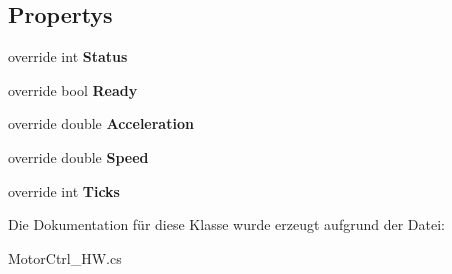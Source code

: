 \subsection*{Propertys}
\begin{DoxyCompactItemize}
\item 
\hypertarget{class_robot_ctrl_1_1_motor_ctrl___h_w_a0c39f88363e68b382cf946f37fe98e16}{
override int {\bfseries Status}}
\label{class_robot_ctrl_1_1_motor_ctrl___h_w_a0c39f88363e68b382cf946f37fe98e16}

\item 
\hypertarget{class_robot_ctrl_1_1_motor_ctrl___h_w_aa5f0c2dd90cf577ef951e58e957976c9}{
override bool {\bfseries Ready}}
\label{class_robot_ctrl_1_1_motor_ctrl___h_w_aa5f0c2dd90cf577ef951e58e957976c9}

\item 
\hypertarget{class_robot_ctrl_1_1_motor_ctrl___h_w_aeee6ccb14bb1c24c2541c64c0ad91c0e}{
override double {\bfseries Acceleration}}
\label{class_robot_ctrl_1_1_motor_ctrl___h_w_aeee6ccb14bb1c24c2541c64c0ad91c0e}

\item 
\hypertarget{class_robot_ctrl_1_1_motor_ctrl___h_w_a037b7d7d65571c8eda634bef767a1870}{
override double {\bfseries Speed}}
\label{class_robot_ctrl_1_1_motor_ctrl___h_w_a037b7d7d65571c8eda634bef767a1870}

\item 
\hypertarget{class_robot_ctrl_1_1_motor_ctrl___h_w_a22603ba1614f7f9eb88f2b7ea0a4c700}{
override int {\bfseries Ticks}}
\label{class_robot_ctrl_1_1_motor_ctrl___h_w_a22603ba1614f7f9eb88f2b7ea0a4c700}

\end{DoxyCompactItemize}


Die Dokumentation für diese Klasse wurde erzeugt aufgrund der Datei:\begin{DoxyCompactItemize}
\item 
MotorCtrl\_\-HW.cs\end{DoxyCompactItemize}
